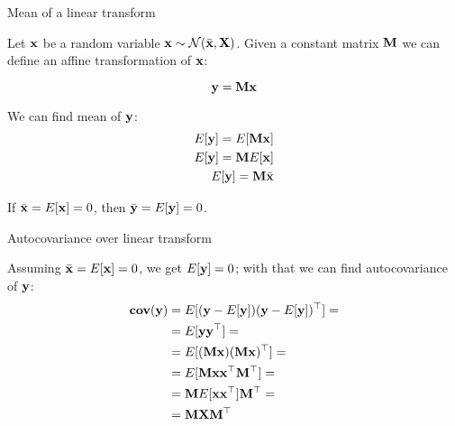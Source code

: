 \documentclass{beamer}
\begin{document}
\begin{frame}{Mean of a linear transform}
	\begin{flushleft}
		
		Let $\mathbf{x}$ be a random variable $\mathbf{x} \sim \mathcal{N} (\bar{\mathbf{x}}, \mathbf{X})$.  Given a constant matrix $\mathbf{M}$ we can define an affine transformation of $\mathbf{x}$:
		
		\begin{equation}
			\mathbf{y} = \mathbf{M}\mathbf{x}
		\end{equation}
		
		We can find mean of $\mathbf{y}$:
		\begin{align}
			E[\mathbf{y}] = E[\mathbf{M}\mathbf{x}] \\
			E[\mathbf{y}] = \mathbf{M}E[\mathbf{x}] \\
			E[\mathbf{y}] = \mathbf{M}\bar{\mathbf{x}}
		\end{align}
		
		If $\bar{\mathbf{x}} = E[\mathbf{x}] = 0$, then $\bar{\mathbf{y}} = E[\mathbf{y}] = 0$.
		
	\end{flushleft}
\end{frame}



\begin{frame}{Autocovariance over linear transform}
	\begin{flushleft}
		
		Assuming $\bar{\mathbf{x}} = E[\mathbf{x}] = 0$, we get $E[\mathbf{y}] = 0$; with that we can find autocovariance of $\mathbf{y}$:
		\begin{align*}
			\textbf{cov}(\mathbf{y}) &= E[(\mathbf{y} - E[\mathbf{y}])(\mathbf{y} - E[\mathbf{y}])^\top] =
			\\
			&=E[\mathbf{y}\mathbf{y}^\top] =
			\\
			&=E[(\mathbf{M}\mathbf{x})(\mathbf{M}\mathbf{x})^\top]=
			\\
			&=E[\mathbf{M}\mathbf{x}\mathbf{x}^\top \mathbf{M}^\top]=
			\\
			&=\mathbf{M}E[\mathbf{x}\mathbf{x}^\top ]\mathbf{M}^\top=
			\\
			&=\mathbf{M}\mathbf{X} \mathbf{M}^\top
		\end{align*}
		
	\end{flushleft}
\end{frame}
\end{document}
